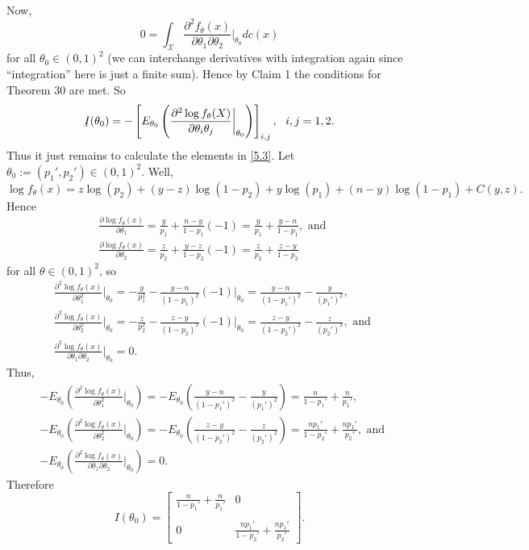 \documentclass[12pt]{article}
\begin{document}
Now,
\begin{equation}
  0 = \int_{\mathcal{X}} \frac{\partial^{2} f_{\theta}(x)}{\partial \theta_1 \partial \theta_2}\bigg|_{\theta_0}dc(x)
  \label{5.2}
\end{equation}
for all $\theta_0 \in (0,1)^{2}$ (we can interchange derivatives with integration again since ``integration'' here is just a finite sum). Hence by
Claim 1 the conditions for Theorem 30 are met. So 
\begin{equation}
  \underaccent{\tilde}{I}(\theta_0) = -\left[ E_{\theta_0}\left( \frac{\partial^{2}\log f_{\theta}(X)}{\partial \theta_i\theta_j}\bigg|_{\theta_0} \right)
  \right]_{i,j}, \ \ i,j = 1,2.
  \label{5.3}
\end{equation}
Thus it just remains to calculate the elements in \eqref{5.3}. Let $\theta_0 := (p_{1}', p_2') \in (0,1)^{2}$. Well,
\[
  \log f_{\theta}(x) = z\log(p_2) + (y - z)\log(1-p_2) + y\log(p_1) + (n-y)\log(1-p_1) + C(y,z).
\]
Hence
\begin{align*}
  & \frac{ \partial \log f_{\theta}(x)}{\partial \theta_1} = \frac{y}{p_1} + \frac{n-y}{1-p_1}(-1) = \frac{y}{p_1} + \frac{y-n}{1-p_1}, \text{ and }\\
  & \frac{ \partial \log f_{\theta}(x)}{\partial \theta_2} = \frac{z}{p_2} + \frac{y-z}{1-p_2}(-1) = \frac{z}{p_2} + \frac{z-y}{1-p_2}
\end{align*}
for all $\theta \in (0,1)^{2}$,
so
\begin{align*}
  & \frac{ \partial^{2} \log f_{\theta}(x)}{\partial \theta_{1}^{2}}\bigg|_{\theta_0} = 
  -\frac{y}{p_1^2} - \frac{y-n}{(1-p_1)^2}(-1)\bigg|_{\theta_0} = \frac{y-n}{(1-p_1')^2} - \frac{y}{(p_1')^2},\\
  & \frac{ \partial^{2} \log f_{\theta}(x)}{\partial \theta_{2}^{2}}\bigg|_{\theta_0} = 
  -\frac{z}{p_2^2} - \frac{z-y}{(1-p_2)^2}(-1)\bigg|_{\theta_0} = \frac{z-y}{(1-p_2')^2} - \frac{z}{(p_2')^{2}}, \text{ and } \\
  & \frac{ \partial^{2} \log f_{\theta}(x)}{\partial \theta_1\partial \theta_{2}}\bigg|_{\theta_0} = 0.
\end{align*}
Thus,
\begin{align*}
  & -E_{\theta_0}\left(\frac{ \partial^{2} \log f_{\theta}(x)}{\partial \theta_{1}^{2}}\bigg|_{\theta_0}\right) = 
  - E_{\theta_0}\left(\frac{y-n}{(1-p_1')^2} - \frac{y}{(p_1')^2} \right) = \frac{n}{1-p_1'} + \frac{n}{p_1'}, \\
  & -E_{\theta_0}\left(\frac{ \partial^{2} \log f_{\theta}(x)}{\partial \theta_{2}^{2}}\bigg|_{\theta_0}\right) = 
  -E_{\theta_0}\left(\frac{z-y}{(1-p_2')^2} - \frac{z}{(p_2')^{2}}\right) = \frac{np_1'}{1-p_2'} + \frac{np_1'}{p_2'}, \text{ and } \\
  & -E_{\theta_0}\left(\frac{ \partial^{2} \log f_{\theta}(x)}{\partial \theta_1\partial \theta_{2}}\bigg|_{\theta_0}\right) = 0.
\end{align*}
Therefore 
\[
  I(\theta_0) = \begin{bmatrix}
    \frac{n}{1-p_1'} + \frac{n}{p_1'} & 0 \\
    \\
    0 & \frac{np_1'}{1-p_2'} + \frac{np_1'}{p_2'}
  \end{bmatrix}.
\]
\end{document}

